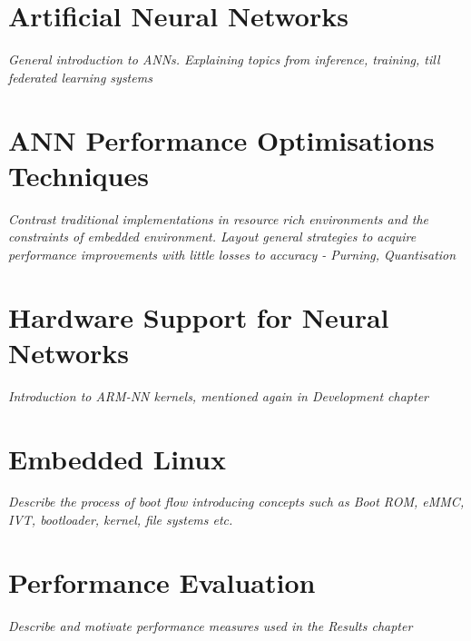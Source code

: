 \section[Artificial Neural Network (ANN)]{Artificial Neural Networks}
\textit{General introduction to ANNs. Explaining topics from inference, training, till federated learning systems}

\section{ANN Performance Optimisations Techniques}
\textit{Contrast traditional implementations in resource rich environments and the constraints of embedded environment. Layout general strategies to acquire performance improvements with little losses to accuracy - Purning, Quantisation}

\section{Hardware Support for Neural Networks}
\textit{Introduction to ARM-NN kernels, mentioned again in Development chapter}

\section{Embedded Linux}
\textit{Describe the process of boot flow introducing concepts such as Boot ROM, eMMC, IVT, bootloader, kernel, file systems etc.}

\section{Performance Evaluation}
\textit{Describe and motivate performance measures used in the Results chapter}
